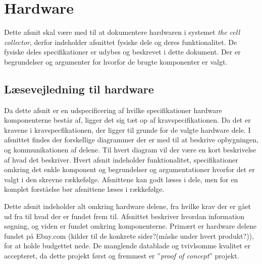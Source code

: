  \section{Hardware}
Dette afsnit skal være med til at dokumentere hardwaren i systemet \textit{the cell collector}, derfor indeholder afsnittet fysiske dele og deres funktionalitet. De fysiske deles specifikationer er udybes og beskrevet i dette dokument. Der er begrundelser og argumenter for hvorfor de brugte komponenter er valgt.

\subsection{Læsevejledning til hardware}
Da dette afsnit er en udspecificering af hvilke specifikationer hardware komponenterne består af, ligger det sig tæt op af kravspecifikationen. Da det er kravene i kravspecfikationen, der ligger til grunde for de valgte hardware dele. I afsnittet findes der forskellige diagrammer der er med til at beskrive opbygningen, og kommunikationen af delene. Til hvert diagram vil der være en kort beskrivelse af hvad det beskriver. Hvert afsnit indeholder funktionalitet, specifikationer omkring det enkle komponent og begrundelser og argumentationer hvorfor det er valgt i den skrevne rækkefølge. Afsnittene kan godt læses i dele, men for en komplet forståelse bør afsnittene læses i rækkefølge. 

 
 
 

 Dette afsnit indeholder alt omkring hardware delene, fra hvilke krav der er gået ud fra til hvad der er fundet frem til.  Afsnittet beskriver hvordan information søgning, og viden er fundet omkring komponenterne. Primært er hardware delene  fundet på Ebay.com (kilder til de konkrete sider?(måske under hvert produkt?)), for at holde budgettet nede. De manglende datablade og tvivlsomme kvalitet er accepteret, da dette projekt først og fremmest er  ”\textit{proof of concept}” projekt.

